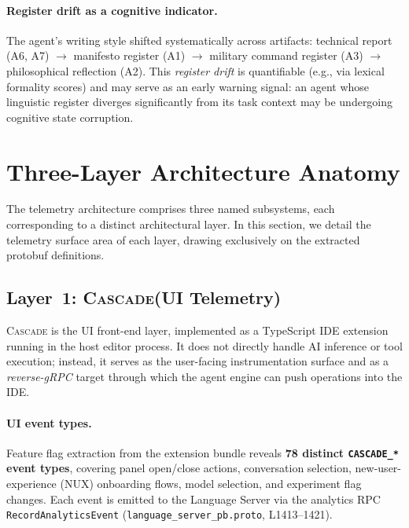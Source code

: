 \documentclass[sigconf,anonymous]{acmart}
\newcommand{\cascade}{\textsc{Cascade}\xspace}
\begin{document}
\paragraph{Register drift as a cognitive indicator.}
The agent's writing style shifted systematically across artifacts:
technical report (A6, A7) $\to$ manifesto register (A1) $\to$
military command register (A3) $\to$ philosophical reflection (A2).
This \emph{register drift} is quantifiable (e.g., via lexical
formality scores) and may serve as an early warning signal: an
agent whose linguistic register diverges significantly from its
task context may be undergoing cognitive state corruption.


\section{Three-Layer Architecture Anatomy}\label{sec:anatomy}

The telemetry architecture comprises three named subsystems, each
corresponding to a distinct architectural layer.  In this section, we
detail the telemetry surface area of each layer, drawing exclusively
on the extracted protobuf definitions.

\subsection{Layer~1: \cascade (UI Telemetry)}\label{sec:cascade}

\cascade is the UI front-end layer, implemented as a TypeScript IDE
extension running in the host editor process.  It does not directly
handle AI inference or tool execution; instead, it serves as the
user-facing instrumentation surface and as a \emph{reverse-gRPC}
target through which the agent engine can push operations into the
IDE.

\paragraph{UI event types.}
Feature flag extraction from the extension bundle reveals \textbf{78
distinct \texttt{CASCADE\_*} event types}, covering panel open/close
actions, conversation selection, new-user-experience (NUX) onboarding
flows, model selection, and experiment flag changes.  Each event is
emitted to the Language Server via the analytics RPC
\texttt{RecordAnalyticsEvent} (\texttt{language\_server\_pb.proto},
L1413--1421).
\end{document}
